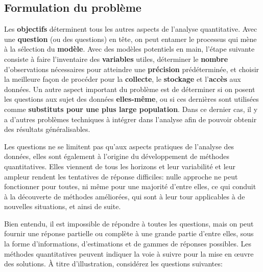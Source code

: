 \subsection{Formulation du problème} Les \textbf{objectifs} déterminent tous les autres aspects de l'analyse quantitative. Avec une \textbf{question} (ou des questions) en tête, on peut entamer le processus qui mène à la sélection du \textbf{modèle}. Avec des modèles potentiels en main, l'étape suivante consiste à faire l'inventaire des \textbf{variables} utiles, déterminer le \textbf{nombre} d'observations nécessaires pour atteindre une \textbf{précision} prédéterminée, et choisir la meilleure façon de procéder pour la \textbf{collecte}, le \textbf{stockage} et l'\textbf{accès} aux données.\newl 
Un autre aspect important du problème est de déterminer si on posent les questions aux sujet des données  \textbf{elles-même}, ou si ces dernières sont utilisées comme \textbf{substituts pour une plus large population}. Dans ce dernier cas, il y a d'autres probl\`emes techniques à intégrer dans l'analyse afin de pouvoir obtenir des résultats généralisables.  
\par Les questions ne se limitent pas qu'aux aspects pratiques de l'analyse des données, elles sont également à l'origine du développement de méthodes quantitatives. Elles viennent de tous les horizons et leur variabilité et leur ampleur rendent les tentatives de réponse difficiles: nulle approche ne peut fonctionner pour toutes, ni même pour une majorité d'entre elles, ce qui conduit à la découverte de  méthodes améliorées, qui sont à leur tour applicables à de nouvelles situations, et ainsi de suite.  
\par 
Bien entendu, il est impossible de répondre à toutes les questions, mais on peut fournir une réponse partielle ou complète à une grande partie d'entre elles, sous la forme d'informations, d'estimations et de gammes de réponses possibles. Les méthodes quantitatives peuvent indiquer la voie à suivre pour la mise en œuvre des solutions.
\newl À titre d'illustration, consid\'erez les questions suivantes:
